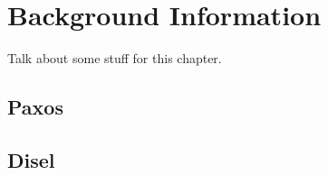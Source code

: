 \chapter{Background Information}
Talk about some stuff for this chapter.

\section{Paxos}

\section{Disel}
